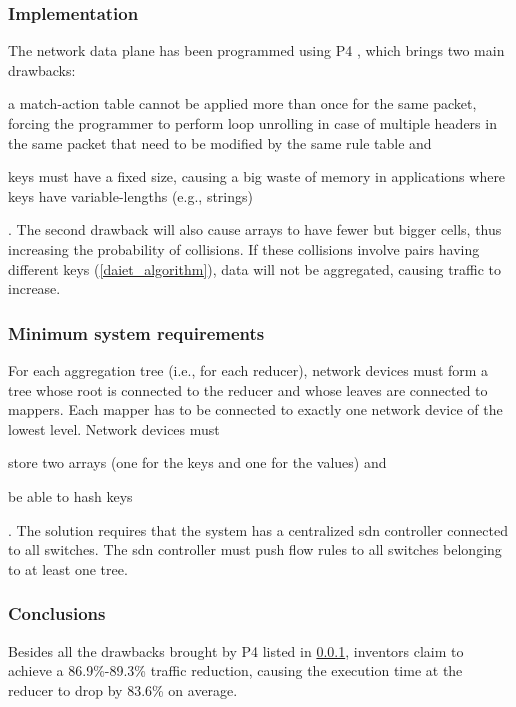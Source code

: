 \subsubsection{Implementation} \label{daiet_implementation} \label{p4_drawbacks}
The network data plane has been programmed using P4 \cite{p4}, which brings two main drawbacks:
\begin{mylist}
    \item a match-action table cannot be applied more than once for the same packet, forcing the programmer to perform loop unrolling in case of multiple headers in the same packet that need to be modified by the same rule table and
    \item keys must have a fixed size, causing a big waste of memory in applications where keys have variable-lengths (e.g., strings)
\end{mylist}.
The second drawback will also cause arrays to have fewer but bigger cells, thus increasing the probability of collisions.
If these collisions involve pairs having different keys (\cref{daiet_algorithm}), data will not be aggregated, causing traffic to increase.

\subsubsection{Minimum system requirements}
For each aggregation tree (i.e., for each reducer), network devices must form a tree whose root is connected to the reducer and whose leaves are connected to mappers.
Each mapper has to be connected to exactly one network device of the lowest level.
Network devices must
\begin{mylist}
    \item store two arrays (one for the keys and one for the values) and
    \item be able to hash keys
\end{mylist}.
The solution requires that the system has a centralized \gls{sdn} controller connected to all switches.
The \gls{sdn} controller must push flow rules to all switches belonging to at least one tree.

\subsubsection{Conclusions}
Besides all the drawbacks brought by P4 \cite{p4} listed in \cref{daiet_implementation}, inventors claim to achieve a 86.9\%-89.3\% traffic reduction, causing the execution time at the reducer to drop by 83.6\% on average.